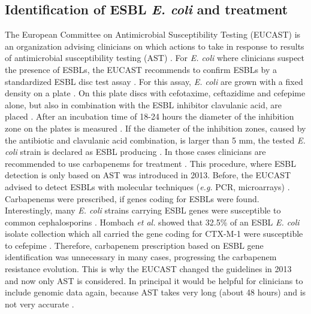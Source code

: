 \subsection{Identification of ESBL \textit{E. coli} and treatment}
The European Committee on Antimicrobial Susceptibility Testing (EUCAST) is an organization advising clinicians on which actions to take in response to results of  antimicrobial susceptibility testing (AST) \cite{leclercq_eucast_2013}. For \textit{E. coli} where clinicians suspect the presence of ESBLs, the EUCAST recommends to confirm ESBLs by a standardized ESBL disc test assay \cite{hombach_consequences_2013}. For this assay, \textit{E. coli} are grown with a fixed density on a plate \cite{disc_test}. On this plate discs with cefotaxime, ceftazidime and cefepime alone, but also in combination with the ESBL inhibitor clavulanic acid, are placed \cite{disc_test}. After an incubation time of 18-24 hours the diameter of the inhibition zone on the plates is measured \cite{disc_test}. If the diameter of the inhibition zones, caused by the antibiotic and clavulanic acid combination, is larger than 5 mm, the tested \textit{E. coli} strain is declared as ESBL producing \cite{disc_test}. In those cases clinicians are recommended to use carbapenems for treatment \cite{mcwilliams_incidence_2014}. This procedure, where ESBL detection is only based on AST was introduced in 2013. Before, the EUCAST advised to detect ESBLs with molecular techniques (\textit{e.g.} PCR, microarrays) \cite{livermore_are_2012}. Carbapenems were prescribed, if genes coding for ESBLs were found. Interestingly, many \textit{E. coli} strains carrying ESBL genes were susceptible to common cephalosporins \cite{hombach_consequences_2013}.
Hombach \textit{et al.} showed that 32.5\% of an ESBL \textit{E. coli} isolate collection which all carried the gene coding for CTX-M-1 were susceptible to cefepime \cite{hombach_consequences_2013}. Therefore, carbapenem prescription based on ESBL gene identification was unnecessary in many cases, progressing the carbapenem resistance evolution. This is why the EUCAST changed the guidelines in 2013 and now only AST is considered. In principal it would be helpful for clinicians to include genomic data again, because AST takes very long (about 48 hours) and is not very accurate \cite{disc_test}\cite{hombach_consequences_2013}.

